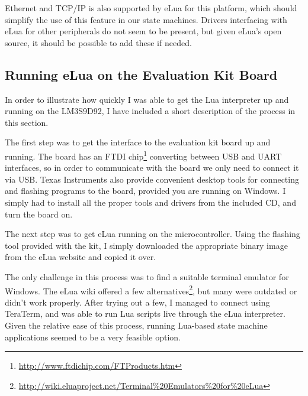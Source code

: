 Ethernet and TCP/IP is also supported by eLua for this platform, which should simplify the use of this feature in our state machines. Drivers interfacing with eLua for other peripherals do not seem to be present, but given eLua's open source, it should be possible to add these if needed.

\subsection{Running eLua on the Evaluation Kit Board}
\label{sec:running_elua}
In order to illustrate how quickly I was able to get the Lua interpreter up and running on the LM3S9D92, I have included a short description of the process in this section.

The first step was to get the interface to the evaluation kit board up and running. The board has an FTDI chip\footnote{\url{http://www.ftdichip.com/FTProducts.htm}} converting between USB and UART interfaces, so in order to communicate with the board we only need to connect it via USB. Texas Instruments also provide convenient desktop tools for connecting and flashing programs to the board, provided you are running on Windows. I simply had to install all the proper tools and drivers from the included CD, and turn the board on.

The next step was to get eLua running on the microcontroller. Using the flashing tool provided with the kit, I simply downloaded the appropriate binary image from the eLua website and copied it over.

The only challenge in this process was to find a suitable terminal emulator for Windows. The eLua wiki offered a few alternatives\footnote{\url{http://wiki.eluaproject.net/Terminal\%20Emulators\%20for\%20eLua}}, but many were outdated or didn't work properly. After trying out a few, I managed to connect using TeraTerm, and was able to run Lua scripts live through the eLua interpreter. Given the relative ease of this process, running Lua-based state machine applications seemed to be a very feasible option.

